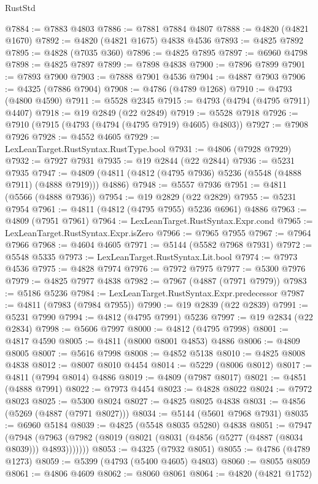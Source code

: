 \begin{lexlean}{RustStd}
\begin{coremodule}
@7884 := @7883 @4803
@7886 := @7881 @7884 @4807
@7888 := @4820 (@4821 @1670)
@7892 := @4820 (@4821 @1675) @4838 @4536
@7893 := @4825 @7892
@7895 := @4828 (@7035 @360)
@7896 := @4825 @7895
@7897 := @6960 @4798
@7898 := @4825 @7897
@7899 := @7898 @4838
@7900 := @7896 @7899
@7901 := @7893 @7900
@7903 := @7888 @7901 @4536
@7904 := @4887 @7903
@7906 := @4325 (@7886 @7904)
@7908 := @4786 (@4789 @1268)
@7910 := @4793 (@4800 @4590)
@7911 := @5528 @2345
@7915 := @4793 (@4794 (@4795 @7911) @4407)
@7918 := @19 @2849 (@22 @2849)
@7919 := @5528 @7918
@7926 := @7910 (@7915 (@4793 (@4794 (@4795 @7919) @4605) @4803))
@7927 := @7908 @7926
@7928 := @4552 @4605
@7929 := LexLeanTarget.RustSyntax.RustType.bool
@7931 := @4806 (@7928 @7929)
@7932 := @7927 @7931
@7935 := @19 @2844 (@22 @2844)
@7936 := @5231 @7935
@7947 := @4809 (@4811 (@4812 (@4795 @7936) @5236 (@5548 (@4888 @7911) (@4888 @7919))) @4886)
@7948 := @5557 @7936
@7951 := @4811 (@5566 (@4888 @7936))
@7954 := @19 @2829 (@22 @2829)
@7955 := @5231 @7954
@7961 := @4811 (@4812 (@4795 @7955) @5236 @6961) @4886
@7963 := @4809 (@7951 @7961)
@7964 := LexLeanTarget.RustSyntax.Expr.cond
@7965 := LexLeanTarget.RustSyntax.Expr.isZero
@7966 := @7965 @7955
@7967 := @7964 @7966
@7968 := @4604 @4605
@7971 := @5144 (@5582 @7968 @7931)
@7972 := @5548 @5335
@7973 := LexLeanTarget.RustSyntax.Lit.bool
@7974 := @7973 @4536
@7975 := @4828 @7974
@7976 := @7972 @7975
@7977 := @5300 @7976
@7979 := @4825 @7977 @4838
@7982 := @7967 (@4887 (@7971 @7979))
@7983 := @5186 @5236
@7984 := LexLeanTarget.RustSyntax.Expr.predecessor
@7987 := @4811 (@7983 (@7984 @7955))
@7990 := @19 @2839 (@22 @2839)
@7991 := @5231 @7990
@7994 := @4812 (@4795 @7991) @5236
@7997 := @19 @2834 (@22 @2834)
@7998 := @5606 @7997
@8000 := @4812 (@4795 @7998)
@8001 := @4817 @4590
@8005 := @4811 (@8000 @8001 @4853) @4886
@8006 := @4809 @8005
@8007 := @5616 @7998
@8008 := @4852 @5138
@8010 := @4825 @8008 @4838
@8012 := @8007 @8010 @4454
@8014 := @5229 (@8006 @8012)
@8017 := @4811 (@7994 @8014) @4886
@8019 := @4809 (@7987 @8017)
@8021 := @4851 (@4888 @7991)
@8022 := @7973 @4454
@8023 := @4828 @8022
@8024 := @7972 @8023
@8025 := @5300 @8024
@8027 := @4825 @8025 @4838
@8031 := @4856 (@5269 (@4887 (@7971 @8027)))
@8034 := @5144 (@5601 @7968 @7931)
@8035 := @6960 @5184
@8039 := @4825 (@5548 @8035 @5280) @4838
@8051 := @7947
    (@7948 (@7963 (@7982 (@8019 (@8021 (@8031 (@4856 (@5277 (@4887 (@8034 @8039))) @4893)))))))
@8053 := @4325 (@7932 @8051)
@8055 := @4786 (@4789 @1273)
@8059 := @5399 (@4793 (@5400 @4605) @4803)
@8060 := @8055 @8059
@8061 := @4806 @4609
@8062 := @8060 @8061
@8064 := @4820 (@4821 @1752)

\end{coremodule}
\end{lexlean}

